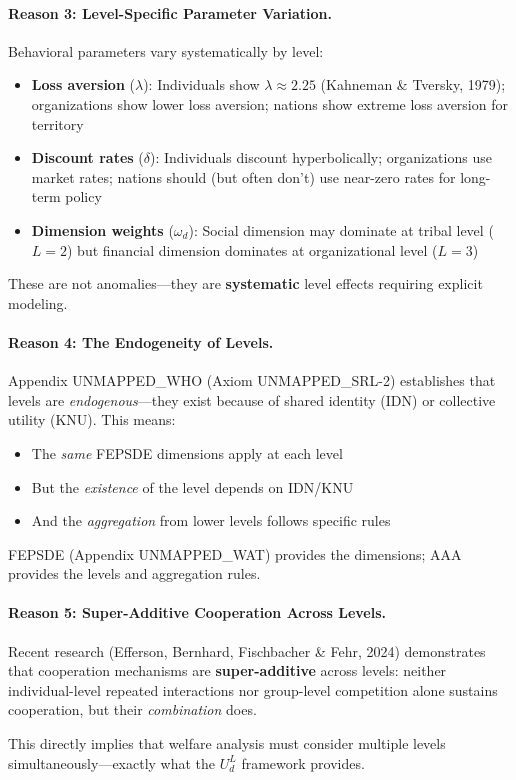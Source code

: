 \begin{tcolorbox}[colback=gray!5!white, colframe=gray!75!black, 
    title=Why AAA $\times$ C Is Theoretically Necessary]
\paragraph{Reason 3: Level-Specific Parameter Variation.}

Behavioral parameters vary systematically by level:
\begin{itemize}[nosep]
\item \textbf{Loss aversion} ($\lambda$): Individuals show $\lambda \approx 2.25$ (Kahneman \& Tversky, 1979); 
      organizations show lower loss aversion; nations show extreme loss aversion for territory
\item \textbf{Discount rates} ($\delta$): Individuals discount hyperbolically; organizations use 
      market rates; nations should (but often don't) use near-zero rates for long-term policy
\item \textbf{Dimension weights} ($\omega_d$): Social dimension may dominate at tribal level ($L=2$) 
      but financial dimension dominates at organizational level ($L=3$)
\end{itemize}

These are not anomalies---they are \textbf{systematic} level effects requiring explicit modeling.

\paragraph{Reason 4: The Endogeneity of Levels.}

Appendix UNMAPPED_WHO (Axiom UNMAPPED_SRL-2) establishes that levels are \textit{endogenous}---they exist 
because of shared identity (IDN) or collective utility (KNU). This means:
\begin{itemize}[nosep]
\item The \textit{same} FEPSDE dimensions apply at each level
\item But the \textit{existence} of the level depends on IDN/KNU
\item And the \textit{aggregation} from lower levels follows specific rules
\end{itemize}

FEPSDE (Appendix UNMAPPED_WAT) provides the dimensions; AAA provides the levels and aggregation rules.

\paragraph{Reason 5: Super-Additive Cooperation Across Levels.}

Recent research (Efferson, Bernhard, Fischbacher \& Fehr, 2024) demonstrates that 
cooperation mechanisms are \textbf{super-additive} across levels: neither individual-level 
repeated interactions nor group-level competition alone sustains cooperation, but their 
\textit{combination} does.

This directly implies that welfare analysis must consider multiple levels simultaneously---exactly 
what the $U^L_d$ framework provides.

\end{tcolorbox}

